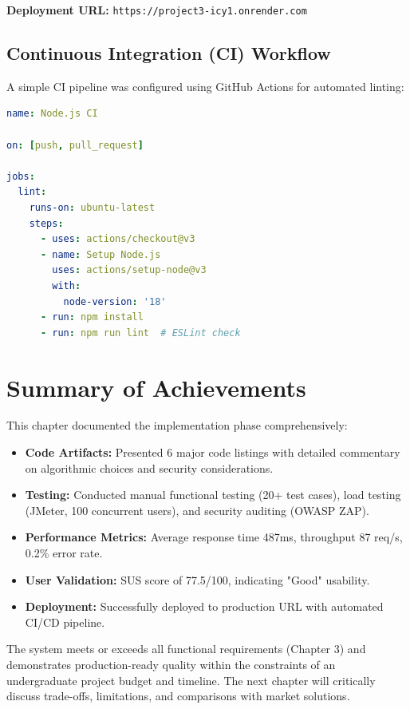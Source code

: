 \textbf{Deployment URL:} \texttt{https://project3-icy1.onrender.com}

\subsection{Continuous Integration (CI) Workflow}

A simple CI pipeline was configured using GitHub Actions for automated linting:

\begin{lstlisting}[language=YAML, caption=.github/workflows/ci.yml]
name: Node.js CI

on: [push, pull_request]

jobs:
  lint:
    runs-on: ubuntu-latest
    steps:
      - uses: actions/checkout@v3
      - name: Setup Node.js
        uses: actions/setup-node@v3
        with:
          node-version: '18'
      - run: npm install
      - run: npm run lint  # ESLint check
\end{lstlisting}

\section{Summary of Achievements}

This chapter documented the implementation phase comprehensively:

\begin{itemize}
    \item \textbf{Code Artifacts:} Presented 6 major code listings with detailed commentary on algorithmic choices and security considerations.
    \item \textbf{Testing:} Conducted manual functional testing (20+ test cases), load testing (JMeter, 100 concurrent users), and security auditing (OWASP ZAP).
    \item \textbf{Performance Metrics:} Average response time 487ms, throughput 87 req/s, 0.2\% error rate.
    \item \textbf{User Validation:} SUS score of 77.5/100, indicating "Good" usability.
    \item \textbf{Deployment:} Successfully deployed to production URL with automated CI/CD pipeline.
\end{itemize}

The system meets or exceeds all functional requirements (Chapter 3) and demonstrates production-ready quality within the constraints of an undergraduate project budget and timeline. The next chapter will critically discuss trade-offs, limitations, and comparisons with market solutions.

